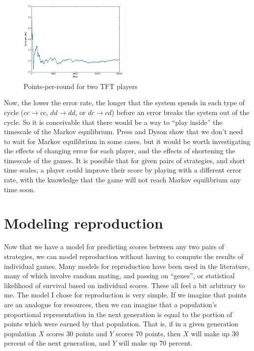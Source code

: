 \documentclass{article}
\begin{document}
\begin{figure}[h]
\begin{center}\includegraphics[width=0.48\textwidth]{tft_tft_simulation.png}
\end{center}\caption{Points-per-round for two TFT players} \label{fig:tft_tft_simulation}
\end{figure}

Now, the lower the error rate, the longer that the system spends in each type of cycle (\(cc \rightarrow cc\), \(dd \rightarrow dd\), or \(dc \rightarrow cd\)) before an error breaks the system out of the cycle. So it is conceivable that there would be a way to ``play inside'' the timescale of the Markov equilibrium. Press and Dyson show that we don't need to wait for Markov equilibrium in some cases, but it would be worth investigating the effects of changing error for each player, and the effects of shortening the timescale of the games. It is possible that for given pairs of strategies, and short time scales, a player could improve their score by playing with a different error rate, with the knowledge that the game will not reach Markov equilibrium any time soon.




\section{Modeling reproduction}

Now that we have a model for predicting scores between any two pairs of strategies, we can model reproduction without having to compute the results of individual games. Many models for reproduction have been used in the literature, many of which involve random mating, and passing on ``genes'', or statistical likelihood of survival based on individual scores. These all feel a bit arbitrary to me. The model I chose for reproduction is very simple. If we imagine that points are an analogue for resources, then we can imagine that a population's proportional representation in the next generation is equal to the portion of points which were earned by that population. That is, if in a given generation population \(X\) scores 30 points and \(Y\) scores 70 points, then \(X\) will make up 30 percent of the next generation, and \(Y\) will make up 70 percent. 
\end{document}
